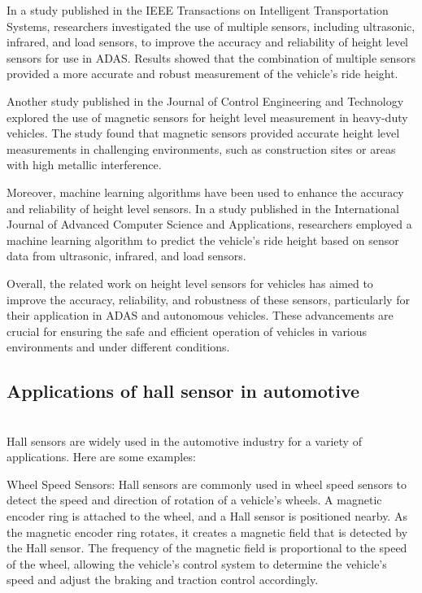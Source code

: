 \documentclass[11pt]{article}
\begin{document}
In a study published in the IEEE Transactions on Intelligent Transportation Systems, researchers investigated the use of multiple sensors, including ultrasonic, infrared, and load sensors, to improve the accuracy and reliability of height level sensors for use in ADAS. Results showed that the combination of multiple sensors provided a more accurate and robust measurement of the vehicle's ride height.

Another study published in the Journal of Control Engineering and Technology explored the use of magnetic sensors for height level measurement in heavy-duty vehicles. The study found that magnetic sensors provided accurate height level measurements in challenging environments, such as construction sites or areas with high metallic interference.

Moreover, machine learning algorithms have been used to enhance the accuracy and reliability of height level sensors. In a study published in the International Journal of Advanced Computer Science and Applications, researchers employed a machine learning algorithm to predict the vehicle's ride height based on sensor data from ultrasonic, infrared, and load sensors.

Overall, the related work on height level sensors for vehicles has aimed to improve the accuracy, reliability, and robustness of these sensors, particularly for their application in ADAS and autonomous vehicles. These advancements are crucial for ensuring the safe and efficient operation of vehicles in various environments and under different conditions.

\subsection{Applications of hall sensor in automotive}
\indent \\Hall sensors are widely used in the automotive industry for a variety of applications. Here are some examples:

Wheel Speed Sensors: Hall sensors are commonly used in wheel speed sensors to detect the speed and direction of rotation of a vehicle's wheels. A magnetic encoder ring is attached to the wheel, and a Hall sensor is positioned nearby. As the magnetic encoder ring rotates, it creates a magnetic field that is detected by the Hall sensor. The frequency of the magnetic field is proportional to the speed of the wheel, allowing the vehicle's control system to determine the vehicle's speed and adjust the braking and traction control accordingly.
\end{document}
